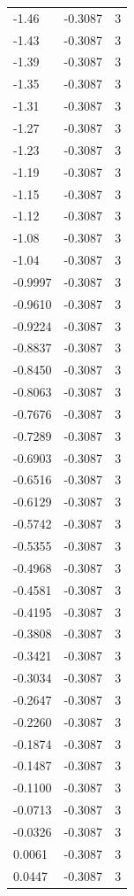 \begin{longtable}{lrr}
  -1.46 & -0.3087 & 3 \\
  -1.43 & -0.3087 & 3 \\
  -1.39 & -0.3087 & 3 \\
  -1.35 & -0.3087 & 3 \\
  -1.31 & -0.3087 & 3 \\
  -1.27 & -0.3087 & 3 \\
  -1.23 & -0.3087 & 3 \\
  -1.19 & -0.3087 & 3 \\
  -1.15 & -0.3087 & 3 \\
  -1.12 & -0.3087 & 3 \\
  -1.08 & -0.3087 & 3 \\
  -1.04 & -0.3087 & 3 \\
  -0.9997 & -0.3087 & 3 \\
  -0.9610 & -0.3087 & 3 \\
  -0.9224 & -0.3087 & 3 \\
  -0.8837 & -0.3087 & 3 \\
  -0.8450 & -0.3087 & 3 \\
  -0.8063 & -0.3087 & 3 \\
  -0.7676 & -0.3087 & 3 \\
  -0.7289 & -0.3087 & 3 \\
  -0.6903 & -0.3087 & 3 \\
  -0.6516 & -0.3087 & 3 \\
  -0.6129 & -0.3087 & 3 \\
  -0.5742 & -0.3087 & 3 \\
  -0.5355 & -0.3087 & 3 \\
  -0.4968 & -0.3087 & 3 \\
  -0.4581 & -0.3087 & 3 \\
  -0.4195 & -0.3087 & 3 \\
  -0.3808 & -0.3087 & 3 \\
  -0.3421 & -0.3087 & 3 \\
  -0.3034 & -0.3087 & 3 \\
  -0.2647 & -0.3087 & 3 \\
  -0.2260 & -0.3087 & 3 \\
  -0.1874 & -0.3087 & 3 \\
  -0.1487 & -0.3087 & 3 \\
  -0.1100 & -0.3087 & 3 \\
  -0.0713 & -0.3087 & 3 \\
  -0.0326 & -0.3087 & 3 \\
  0.0061 & -0.3087 & 3 \\
  0.0447 & -0.3087 & 3 \\

\end{longtable}
